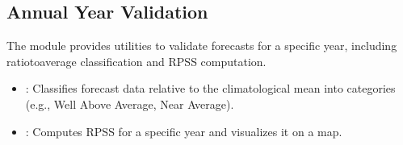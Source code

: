 \documentclass[letterpaper,10pt,english]{sphinxmanual}
\begin{document}
\subsection{Annual Year Validation}
\label{\detokenize{Verification:annual-year-validation}}
\sphinxAtStartPar
The module provides utilities to validate forecasts for a specific year, including ratio\sphinxhyphen{}to\sphinxhyphen{}average classification and RPSS computation.

\sphinxAtStartPar
{}
\begin{itemize}
\item {} 
\sphinxAtStartPar
{}: Classifies forecast data relative to the climatological mean into categories (e.g., Well Above Average, Near Average).

\item {} 
\sphinxAtStartPar
{}: Computes RPSS for a specific year and visualizes it on a map.

\end{itemize}

\sphinxAtStartPar
{}
\end{document}
